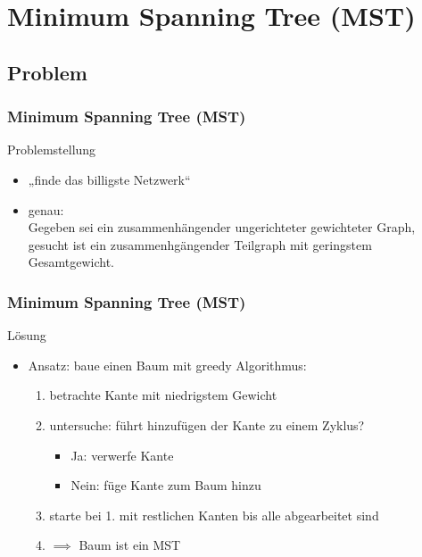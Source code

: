 \section{Minimum Spanning Tree (MST)}

\subsection{Problem}


\begin{frame}
\frametitle{Minimum Spanning Tree (MST)}
\begin{block}{Problemstellung}
\begin{itemize}
\item „finde das billigste Netzwerk“
\item genau: \\
Gegeben sei ein zusammenhängender ungerichteter gewichteter Graph, gesucht ist ein zusammenhgängender Teilgraph mit geringstem Gesamtgewicht.
\end{itemize}
\end{block}

\end{frame}

\begin{frame}
\frametitle{Minimum Spanning Tree (MST)}
\begin{block}{Lösung}
\begin{itemize}
\item Ansatz: baue einen Baum mit greedy Algorithmus:
\begin{enumerate}
\item betrachte Kante mit niedrigstem Gewicht
\item untersuche: führt hinzufügen der Kante zu einem Zyklus?
\begin{itemize}
\item Ja: verwerfe Kante
\item Nein: füge Kante zum Baum hinzu
\end{itemize}
\item starte bei 1. mit restlichen Kanten bis alle abgearbeitet sind
\item $ \implies $ Baum ist ein MST
\end{enumerate}
\end{itemize}
\end{block}

\end{frame}

